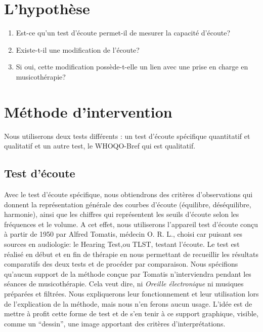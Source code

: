 \section{L'hypothèse}



\begin{enumerate}
\item Est-ce  qu'un test d'écoute permet-il de mesurer  la capacité 
  d'écoute?
  

 
\item Existe-t-il une modification de l'écoute?

 
  
\item Si oui, cette modification possède-t-elle un lien avec une prise en charge
  en musicothérapie?
  
\end{enumerate}






 

\section{Méthode d'intervention}

	Nous utiliserons deux tests différents : 
	un test d'écoute spécifique quantitatif et qualitatif 
	et un autre test, le WHOQO-Bref qui est qualitatif.

		
        \subsection{Test d'écoute}
        
Avec le test d'écoute spécifique, nous obtiendrons des
         critères d'observations qui donnent la 
	représentation générale des courbes d'écoute (équilibre, déséquilibre, harmonie), ainsi que les 
	chiffres qui représentent les seuils d'écoute selon les fréquences et le volume. 
	A cet effet, nous utiliserons l'appareil test
        d'écoute conçu à partir de 1950 par Alfred Tomatis, médecin
        O. R. L., choisi car puisant ses sources en audiologie: le Hearing Test,ou TLST, testant
        l'écoute.
	Le test est réalisé en début et en fin de thérapie
        en nous permettant de recueillir les résultats comparatifs des
        deux tests et de procéder par comparaison.
        Nous spécifions qu'aucun support de la méthode conçue par
        Tomatis n'interviendra pendant les séances de musicothérapie.
        Cela veut dire, ni 
\textsl{Oreille
	électronique} ni musiques préparées et filtrées. Nous
      expliquerons leur fonctionnement et leur utilisation lors de
      l'explication de la méthode, mais nous n'en ferons aucun
      usage. L'idée est de mettre à profit cette forme de test et de
      s'en tenir à ce support graphique, visible, comme un ``dessin'',
      une image apportant des critères d'interprétations.
       
